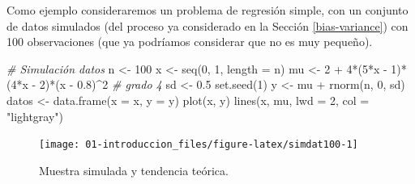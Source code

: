 \documentclass[
  spanish,
]{book}
\newenvironment{Shaded}{\begin{snugshade}}{\end{snugshade}}
\newcommand{\AttributeTok}[1]{\textcolor[rgb]{0.77,0.63,0.00}{#1}}
\newcommand{\CommentTok}[1]{\textcolor[rgb]{0.56,0.35,0.01}{\textit{#1}}}
\newcommand{\DecValTok}[1]{\textcolor[rgb]{0.00,0.00,0.81}{#1}}
\newcommand{\FloatTok}[1]{\textcolor[rgb]{0.00,0.00,0.81}{#1}}
\newcommand{\FunctionTok}[1]{\textcolor[rgb]{0.00,0.00,0.00}{#1}}
\newcommand{\NormalTok}[1]{#1}
\newcommand{\OtherTok}[1]{\textcolor[rgb]{0.56,0.35,0.01}{#1}}
\newcommand{\SpecialCharTok}[1]{\textcolor[rgb]{0.00,0.00,0.00}{#1}}
\newcommand{\StringTok}[1]{\textcolor[rgb]{0.31,0.60,0.02}{#1}}
\theoremstyle{break}
\theoremstyle{definition}
\theoremstyle{definition}
\theoremstyle{definition}
\theoremstyle{definition}
\theoremstyle{remark}
\begin{document}
Como ejemplo consideraremos un problema de regresión simple, con un conjunto de datos simulados (del proceso ya considerado en la Sección \ref{bias-variance}) con 100 observaciones (que ya podríamos considerar que no es muy pequeño).

\begin{Shaded}
\begin{Highlighting}[]
\CommentTok{\# Simulación datos}
\NormalTok{n }\OtherTok{\textless{}{-}} \DecValTok{100}
\NormalTok{x }\OtherTok{\textless{}{-}} \FunctionTok{seq}\NormalTok{(}\DecValTok{0}\NormalTok{, }\DecValTok{1}\NormalTok{, }\AttributeTok{length =}\NormalTok{ n)}
\NormalTok{mu }\OtherTok{\textless{}{-}} \DecValTok{2} \SpecialCharTok{+} \DecValTok{4}\SpecialCharTok{*}\NormalTok{(}\DecValTok{5}\SpecialCharTok{*}\NormalTok{x }\SpecialCharTok{{-}} \DecValTok{1}\NormalTok{)}\SpecialCharTok{*}\NormalTok{(}\DecValTok{4}\SpecialCharTok{*}\NormalTok{x }\SpecialCharTok{{-}} \DecValTok{2}\NormalTok{)}\SpecialCharTok{*}\NormalTok{(x }\SpecialCharTok{{-}} \FloatTok{0.8}\NormalTok{)}\SpecialCharTok{\^{}}\DecValTok{2} \CommentTok{\# grado 4}
\NormalTok{sd }\OtherTok{\textless{}{-}} \FloatTok{0.5}
\FunctionTok{set.seed}\NormalTok{(}\DecValTok{1}\NormalTok{)}
\NormalTok{y }\OtherTok{\textless{}{-}}\NormalTok{ mu }\SpecialCharTok{+} \FunctionTok{rnorm}\NormalTok{(n, }\DecValTok{0}\NormalTok{, sd)}
\NormalTok{datos }\OtherTok{\textless{}{-}} \FunctionTok{data.frame}\NormalTok{(}\AttributeTok{x =}\NormalTok{ x, }\AttributeTok{y =}\NormalTok{ y)}
\FunctionTok{plot}\NormalTok{(x, y) }
\FunctionTok{lines}\NormalTok{(x, mu, }\AttributeTok{lwd =} \DecValTok{2}\NormalTok{, }\AttributeTok{col =} \StringTok{"lightgray"}\NormalTok{)}
\end{Highlighting}
\end{Shaded}

\begin{figure}[!htb]

{\centering \texttt{[image: 01-introduccion\_files/figure-latex/simdat100-1]} 

}

\caption{Muestra simulada y tendencia teórica.}\label{fig:simdat100}
\end{figure}
\end{document}
